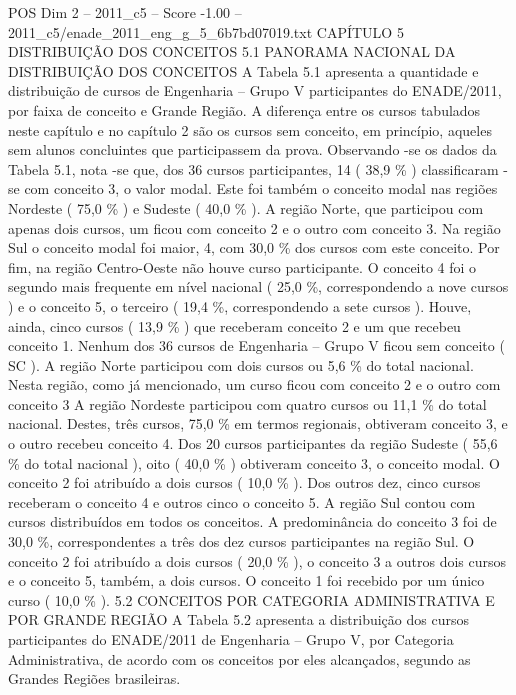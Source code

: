 \begin{textsample}{POS Dim 2 – 2011\_c5 – Score -1.00 – 2011\_c5/enade\_2011\_eng\_g\_5\_6b7bd07019.txt}  \label{ex:f2_pos_345}
CAPÍTULO 5 DISTRIBUIÇÃO DOS CONCEITOS 5.1 PANORAMA NACIONAL DA DISTRIBUIÇÃO DOS CONCEITOS A Tabela 5.1 apresenta a quantidade e distribuição de cursos de Engenharia – Grupo V participantes do ENADE/2011, por faixa de conceito e Grande Região.
A diferença entre os cursos tabulados neste capítulo e no capítulo 2 são os cursos sem conceito, em princípio, aqueles sem alunos concluintes que participassem da prova.
Observando -se os dados da Tabela 5.1, nota -se que, dos 36 cursos participantes, 14 ( 38,9 \% ) classificaram -se com conceito 3, o valor modal.
Este foi também o conceito modal nas regiões Nordeste ( 75,0 \% ) e Sudeste ( 40,0 \% ).
A região Norte, que participou com apenas dois cursos, um ficou com conceito 2 e o outro com conceito 3.
Na região Sul o conceito modal foi maior, 4, com 30,0 \% dos cursos com este conceito.
Por fim, na região Centro-Oeste não houve curso participante.
O conceito 4 foi o segundo mais frequente em nível nacional ( 25,0 \%, correspondendo a nove cursos ) e o conceito 5, o terceiro ( 19,4 \%, correspondendo a sete cursos ).
Houve, ainda, cinco cursos ( 13,9 \% ) que receberam conceito 2 e um que recebeu conceito 1.
Nenhum dos 36 cursos de Engenharia – Grupo V ficou sem conceito ( SC ).
A região Norte participou com dois cursos ou 5,6 \% do total nacional.
Nesta região, como já mencionado, um curso ficou com conceito 2 e o outro com conceito 3 A região Nordeste participou com quatro cursos ou 11,1 \% do total nacional.
Destes, três cursos, 75,0 \% em termos regionais, obtiveram conceito 3, e o outro recebeu conceito 4.
Dos 20 cursos participantes da região Sudeste ( 55,6 \% do total nacional ), oito ( 40,0 \% ) obtiveram conceito 3, o conceito modal.
O conceito 2 foi atribuído a dois cursos ( 10,0 \% ).
Dos outros dez, cinco cursos receberam o conceito 4 e outros cinco o conceito 5.
A região Sul contou com cursos distribuídos em todos os conceitos.
A predominância do conceito 3 foi de 30,0 \%, correspondentes a três dos dez cursos participantes na região Sul.
O conceito 2 foi atribuído a dois cursos ( 20,0 \% ), o conceito 3 a outros dois cursos e o conceito 5, também, a dois cursos.
O conceito 1 foi recebido por um único curso ( 10,0 \% ). 5.2 CONCEITOS POR CATEGORIA ADMINISTRATIVA E POR GRANDE REGIÃO A Tabela 5.2 apresenta a distribuição dos cursos participantes do ENADE/2011 de Engenharia – Grupo V, por Categoria Administrativa, de acordo com os conceitos por eles alcançados, segundo as Grandes Regiões brasileiras.

\end{textsample}
